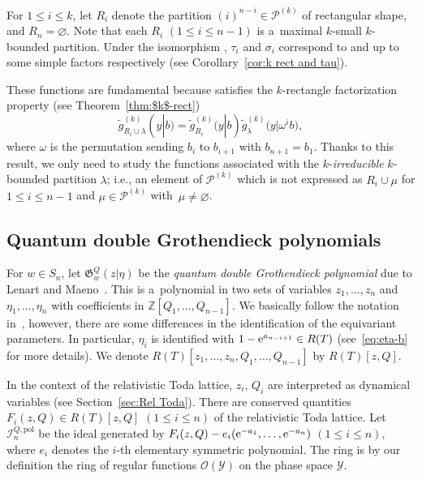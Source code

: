 \documentclass[pdftex]{sigma}
\numberwithin{equation}{section}
\newcommand{\Gro}[1]{\mathfrak{G}^Q_{#1}}
\newcommand{\la}{\lambda}
\newcommand{\Rep}{{R(T)}}
\newcommand{\Z}{\mathbb{Z}}
\theoremstyle{definition}
\begin{document}
For $1\le i\le k$, let $R_i$ denote the partition $(i)^{n-i}\in \mathscr{P}^{(k)}$ of rectangular shape, and $R_n=\varnothing$.
Note that each $R_i$ $(1\le i\le n-1)$ is a~maximal $k$-small $k$-bounded partition.
Under the isomorphism
\smash{$ \mathscr{O}(\mathscr{Z})
\cong \hat{\Lambda}^{\Rep}_{(n)}$},
$\tau_i$ and $\sigma_i$
correspond to  and  up to
some simple factors respectively (see Corollary~\ref{cor:k rect and tau}).

These functions are fundamental because
\smash{$\tilde{g}_{\la}^{(k)}(y|b)$} satisfies the $k$-rectangle factorization property (see Theorem~\ref{thm:$k$-rect})
\[
\tilde{g}_{R_i\cup \la}^{(k)}(y|b)=\tilde{g}_{R_i}^{(k)}(y|b)
\tilde{g}_{\la}^{(k)}\bigl(y|\omega^ib\bigr),
\]
where $\omega$ is the permutation sending $b_i$ to $b_{i+1}$ with $b_{n+1}=b_1$.
Thanks to this result, we only need to study the functions \smash{$\tilde{g}_\la^{(k)}(y|b)$} associated with the
$k$-\emph{irreducible} $k$-bounded partition $\la$; i.e., an element of $\mathscr{P}^{(k)}$ which is not expressed as $R_i\cup\mu$ for $1\le i\le n-1$ and $\mu\in \mathscr{P}^{(k)}$
with~${\mu\ne \varnothing}$.

\subsection{Quantum double Grothendieck polynomials}

For $w\in S_n$, let $\Gro{w}(z| \eta)$ be the \emph{quantum double
Grothendieck polynomial} due to Lenart and Maeno~\cite{LM}.
This is a~polynomial in two sets of variables
$z_1,\dots,z_n$ and $\eta_1,\dots,\eta_n$ with coefficients in
$\Z[Q_1,\dots,Q_{n-1}]$.
We basically follow the notation in~\cite{MNS2}, however,
there are some differences in the identification of the equivariant parameters.
In particular, $\eta_i$ is identified with $1-{\rm e}^{a_{n-i+1}}\in \Rep$ (see~\eqref{eq:eta-b} for more details).
We denote $\Rep[z_1,\dots,z_n,Q_1,\dots,Q_{n-1}]$ by $\Rep[z,Q]$.

In the context of the relativistic Toda lattice,
$z_i$, $Q_i$ are interpreted as dynamical variables (see Section~\ref{sec:Rel Toda}).
There are conserved quantities $F_i(z,Q)\in \Rep[z,Q]$ $(1\le i\le n)$ of the relativistic Toda lattice.
Let $\mathscr{I}_n^{Q,\mathrm{pol}}$ be the
ideal generated by $F_i(z,Q)-e_i({\rm e}^{-a_1},\dots,{\rm e}^{-a_n})$ $(1\le i\le n)$, where $e_i$ denotes the $i$-th elementary
symmetric polynomial.
The ring \smash{$\Rep[z,Q]/\mathscr{I}_n^{Q,\mathrm{pol}}$} is by our definition
the ring of regular functions $\mathscr{O}(\mathscr{Y})$ on the
phase space $\mathscr{Y}$.
\end{document}
